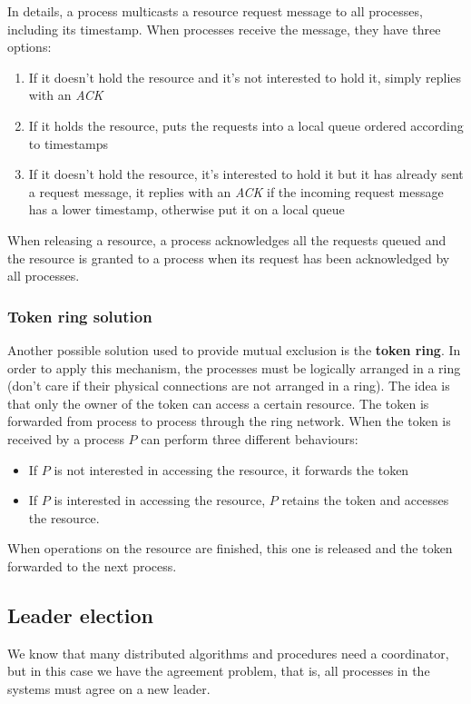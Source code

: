 In details, a process multicasts a resource request message to all processes, including its timestamp. When processes receive the message, they have three options:
\begin{enumerate}
    \item If it doesn't hold the resource and it's not interested to hold it, simply replies with an \textit{ACK}
    \item If it holds the resource, puts the requests into a local queue ordered according to timestamps
    \item If it doesn't hold the resource, it's interested to hold it but it has already sent a request message, it replies with an \textit{ACK} if the incoming request message has a lower timestamp, otherwise put it on a local queue
\end{enumerate}
When releasing a resource, a process acknowledges all the requests queued and the resource is granted to a process when its request has been acknowledged by all processes.

\subsubsection{Token ring solution}
Another possible solution used to provide mutual exclusion is the \textbf{token ring}. In order to apply this mechanism, the processes must be logically arranged in a ring (don't care if their physical connections are not arranged in a ring).
The idea is that only the owner of the token can access a certain resource. The token is forwarded from process to process through the ring network. When the token is received by a process $P$ can perform three different behaviours:
\begin{itemize}
    \item If $P$ is not interested in accessing the resource, it forwards the token
    \item If $P$ is interested in accessing the resource, $P$ retains the token and accesses the resource.
\end{itemize}
When operations on the resource are finished, this one is released and the token forwarded to the next process.

\subsection{Leader election}
We know that many distributed algorithms and procedures need a coordinator, but in this case we have the agreement problem, that is, all processes in the systems must agree on a new leader. 


